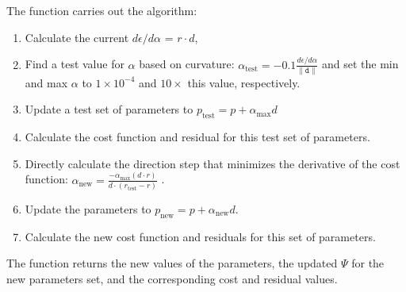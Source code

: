 \documentclass[]{pasj01}
\newcommand{\Katherine}[1]{{\textcolor{ForestGreen}{\bfseries{[#1]}}}}
\begin{document}
\noindent{}The function carries out the algorithm:
\begin{enumerate}
    \item Calculate the current $d\epsilon/d\alpha$ = $r\cdot d$,
    \item Find a test value for $\alpha$ based on curvature: $\alpha_{\text{test}}=-0.1 \frac{d\epsilon/ d\alpha}{\|\texttt{d}\|} $ and set the min and max $\alpha$ to $1\times10^{-4}$ and $10\times$ this value, respectively.
    \item Update a test set of parameters to $p_{\text{test}}=p+\alpha_{\text{max}}d$
    \item Calculate the cost function and residual for this test set of parameters.
    \item Directly calculate the direction step that minimizes the derivative of the cost function: $\alpha_{\text{new}} = \frac{-\alpha_{\text{max}}(d\cdot r)}{d\cdot(r_{\text{test}}-r)}$ .
    \item Update the parameters to $p_{\text{new}}=p+\alpha_{\text{new}}d$.
    \item Calculate the new cost function and residuals for this set of parameters.
\end{enumerate}
The function returns the new values of the parameters, the updated $\Psi$ for the new parameters set, and the corresponding cost and residual values.
\end{document}
